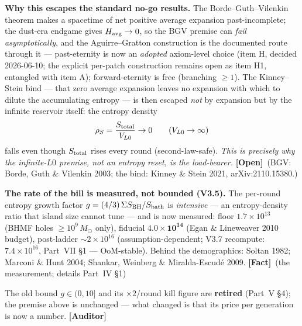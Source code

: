 \documentclass[11pt]{article}
\newcommand{\Fact}{\textbf{\textcolor{green!45!black}{[Fact]}}}
\newcommand{\Open}{\textbf{\textcolor{gray!10!black}{[Open]}}}
\newcommand{\Auditor}{\textbf{\textcolor{teal!55!black}{[Auditor]}}}
\newcommand{\msun}{M_\odot}
\begin{document}
\textbf{Why this escapes the standard no-go results.} The Borde--Guth--Vilenkin theorem makes a spacetime of net positive average expansion past-incomplete; the dust-era endgame gives $H_{\rm avg}\to0$, so the BGV premise can \emph{fail asymptotically}, and the Aguirre--Gratton construction is the documented route through it --- past-eternity is now an \emph{adopted} axiom-level choice (item H, decided 2026-06-10; the explicit per-patch construction remains open as item H1, entangled with item A); forward-eternity is free (branching $\ge1$). The Kinney--Stein bind --- that zero average expansion leaves no expansion with which to dilute the accumulating entropy --- is then escaped \emph{not} by expansion but by the infinite reservoir itself: the entropy density
\begin{equation}
\rho_S=\frac{S_{\rm total}}{V_{L0}}\to 0\qquad(V_{L0}\to\infty)
\end{equation}
falls even though $S_{\rm total}$ rises every round (second-law-safe). \emph{This is precisely why the infinite-$L0$ premise, not an entropy reset, is the load-bearer.} \Open\ (BGV: Borde, Guth \& Vilenkin 2003; the bind: Kinney \& Stein 2021, arXiv:2110.15380.)

\textbf{The rate of the bill is measured, not bounded (V3.5).} The per-round entropy growth factor $g=(4/3)\,\Sigma S_{\rm BH}/S_{\rm bath}$ is \emph{intensive} --- an entropy-density ratio that island size cannot tune --- and is now measured: floor $1.7\times10^{13}$ (BHMF holes $\ge10^9\,\msun$ only), fiducial $\mathbf{4.0\times10^{14}}$ (Egan \& Lineweaver 2010 budget), post-ladder $\sim\!2\times10^{16}$ (assumption-dependent; V3.7 recompute: $7.4\times10^{16}$, Part~VII \S1 --- OoM-stable). Behind the demographics: Soltan 1982; Marconi \& Hunt 2004; Shankar, Weinberg \& Miralda-Escud\'e 2009. \Fact\ (the measurement; details Part~IV \S1)
\begin{center}\end{center}
The old bound $g\in(0,10]$ and its $\times2$/round kill figure are \textbf{retired} (Part~V \S4); the premise above is unchanged --- what changed is that its price per generation is now a number. \Auditor

\end{document}

